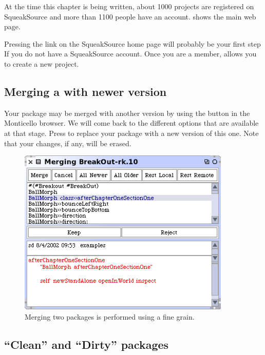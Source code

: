 \documentclass[a4paper,10pt,twoside]{book}
\begin{document}
At the time this chapter is being written, about 1000 projects are registered on SqueakSource and more than 1100 people have an account.  shows the main web page.  

Pressing the  link on the SqueakSource home page will probably be your first step If you do not have a SqueakSource account. 
Once you are a member,  allows you to create a new project. 

\subsection{Merging a with newer version}

Your package may be merged with another version by using the  button in the Monticello browser. We will come back to the different options that are available at that stage. Press  to replace your package with a new version of this one. Note that your changes, if any, will be erased.

\begin{figure}[ht]\centering
	\includegraphics[width=.75\linewidth]{merger}
	\caption{Merging two packages is performed using a fine grain.
	}
\end{figure}

\subsection{``Clean'' and ``Dirty'' packages}
\end{document}

